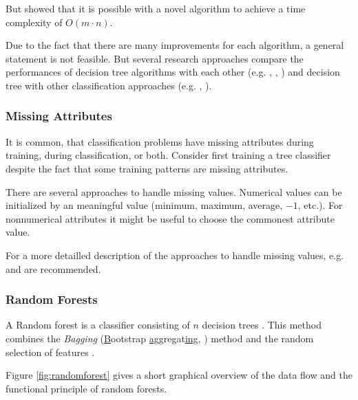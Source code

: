 But \cite{su2006fast} showed that it is possible with a novel algorithm to achieve a time complexity of $O(m \cdot n)$.  


Due to the fact that there are many improvements for each algorithm, a general statement is not feasible. But several research approaches compare the performances of decision tree algorithms with each other (e.g. \cite{lavanya2011performance}, \cite{banfield2007comparison}, \cite{safavian1991survey}) and decision tree with other classification approaches (e.g. \cite{huang2003comparing}, \cite{curram1994neural}). 



\subsubsection{Missing Attributes}

It is common, that classification problems have missing attributes during training, during classification, or both. Consider first training a tree classifier despite the fact that some training patterns are missing attributes. 

There are several approaches to handle missing values. Numerical values can be initialized by an meaningful value (minimum, maximum, average, $-1$, etc.). For nonnumerical attributes it might be useful to choose the commonest attribute value. 

For a more detailled description of the approaches to handle missing values, e.g. \cite{zhang2005missing} and \cite[p. 59 ff.]{rokach2008data} are recommended.


\subsubsection{Random Forests}

A Random forest is a classifier consisting of $n$ decision trees \cite{tong2003decision}. This method combines the \textit{Bagging} (\underline{B}ootstrap \underline{agg}regat\underline{ing}, \cite[p. 105ff.]{rokach2008data}) method and the random selection of features \cite[p. 87 ff.]{rokach2008data}. 

Figure \ref{fig:randomforest} gives a short graphical overview of the data flow and the functional principle of random forests.
 

